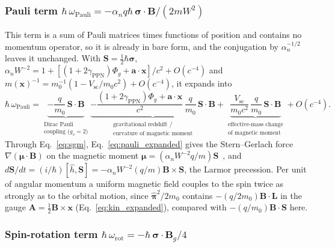 \documentclass[aps,prd,onecolumn,tightenlines,nofootinbib,notitlepage,11pt,floatfix]{revtex4-2}
\theoremstyle{indentedtheorem}
\begin{document}
\subsubsection{Pauli term \texorpdfstring{$\hbar\,\omega_\text{Pauli}=-\alpha_nq\hbar\,\boldsymbol{\sigma}\cdot\mathbf{B}/(2mW^2)$}{hbar omega Pauli}}
\label{sec:term_pauli}

This term is a sum of Pauli matrices times functions of position and contains no momentum operator, so it is already in bare form, and the conjugation by $\alpha_n^{-1/2}$ leaves it unchanged. With $\mathbf{S}=\tfrac{1}{2}\hbar\boldsymbol{\sigma}$, $\alpha_nW^{-2} = 1 + [(1+2\gamma_\text{PPN})\Phi_g + \mathbf{a}\cdot\mathbf{x}]/c^2 + O(c^{-4})$ and $m(\mathbf{x})^{-1} = m_0^{-1}(1 - V_\text{sc}/m_0c^2) + O(c^{-4})$, it expands into
\begin{equation}
    \hbar\,\omega_\text{Pauli} =
    \underbrace{- \frac{q}{m_0}\,\mathbf{S}\cdot\mathbf{B}}_{\substack{\text{Dirac Pauli} \\ \text{coupling ($g_s=2$)}}}
    \underbrace{- \frac{(1+2\gamma_\text{PPN})\Phi_g + \mathbf{a}\cdot\mathbf{x}}{c^2}\,\frac{q}{m_0}\,\mathbf{S}\cdot\mathbf{B}}_{\substack{\text{gravitational redshift /} \\ \text{curvature of magnetic moment}}}
    + \underbrace{\frac{V_\text{sc}}{m_0c^2}\,\frac{q}{m_0}\,\mathbf{S}\cdot\mathbf{B}}_{\substack{\text{effective-mass change} \\ \text{of magnetic moment}}} + O(c^{-4}) .
    \label{eq:pauli_expanded}
\end{equation}
Through Eq.~\eqref{eq:sgm}, Eq.~\eqref{eq:pauli_expanded} gives the Stern--Gerlach force $\nabla(\boldsymbol{\mu}\cdot\mathbf{B})$ on the magnetic moment $\boldsymbol{\mu} = (\alpha_n W^{-2}q/m)\mathbf{S}$~\citep{Dirac1928Quantum,SternGerlach1922Quantized}, and $d\mathbf{S}/dt=(i/\hbar)[\hat{h},\mathbf{S}]=-\alpha_n W^{-2}(q/m)\mathbf{B}\times\mathbf{S}$, the Larmor precession. Per unit of angular momentum a uniform magnetic field couples to the spin twice as strongly as to the orbital motion, since $\hat{\boldsymbol{\pi}}^2/2m_0$ contains $-(q/2m_0)\mathbf{B}\cdot\mathbf{L}$ in the gauge $\mathbf{A}=\tfrac{1}{2}\mathbf{B}\times\mathbf{x}$ (Eq.~\eqref{eq:kin_expanded}), compared with $-(q/m_0)\mathbf{B}\cdot\mathbf{S}$ here.

\subsubsection{Spin-rotation term \texorpdfstring{$\hbar\,\omega_\text{rot}=-\hbar\,\boldsymbol{\sigma}\cdot\mathbf{B}_g/4$}{hbar omega rot}}
\label{sec:term_rot}
\end{document}
